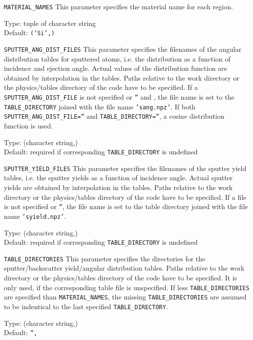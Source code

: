 \begin{keydescription}{\texttt{MATERIAL\_NAMES}}
This parameter specifies the material name for each region. 
\begin{keytab}
   Type:    \> tuple of character string \\
   Default: \> \texttt{('Si',)}
\end{keytab}
\end{keydescription}

\begin{keydescription}{\texttt{SPUTTER\_ANG\_DIST\_FILES}}
This parameter specifies the filenames of the angular distribution tables for
sputtered atoms, i.e. the distribution as a function of incidence and
ejection angle. Actual values of the distribution function are obtained by
interpolation in the tables. Paths relative to the work
directory or the physics/tables directory of the code have to be specified. If a
\texttt{SPUTTER\_ANG\_DIST\_FILE} is not specified or \texttt{''} and , the file
name is set to the \texttt{TABLE\_DIRECTORY} joined with the file
name \texttt{'sang.npz'}. If both \texttt{SPUTTER\_ANG\_DIST\_FILE=''} and
\texttt{TABLE\_DIRECTORY=''}, a cosine distribution function is used.
\begin{keytab}
   Type:    \> (character string,) \\
   Default: \> required if corresponding \texttt{TABLE\_DIRECTORY} is
			   undefined 
\end{keytab}
\end{keydescription}

\begin{keydescription}{\texttt{SPUTTER\_YIELD\_FILES}}
This parameter specifies the filenames of the sputter yield tables, i.e. the
sputter yields as a function of incidence angle. Actual sputter yields are
obtained by interpolation in the tables. Paths relative to the work
directory or the physics/tables directory of the code have to be specified. If a
file is not specified or \texttt{''}, the file name is set to the table directory
joined with the file name \texttt{'syield.npz'}.
\begin{keytab} 
   Type:    \> (character string,) \\
   Default: \> required if corresponding \texttt{TABLE\_DIRECTORY} is
   			   undefined \\ 
\end{keytab}
\end{keydescription}

\begin{keydescription}{\texttt{TABLE\_DIRECTORIES}}
This parameter specifies the directories for the sputter/backscatter
yield/angular distribution tables. Paths relative to the work directory or the
physics/tables directory of the code have to be specified. It is only used, if
the corresponding table file is unspecified. If less \texttt{TABLE\_DIRECTORIES}
are specified than  \texttt{MATERIAL\_NAMES}, the missing
\texttt{TABLE\_DIRECTORIES} are  assumed to be indentical to the last specified
\texttt{TABLE\_DIRECTORY}. 
\begin{keytab}
   Type:    \> (character string,) \\
   Default: \> \texttt{'',}
\end{keytab}
\end{keydescription}
